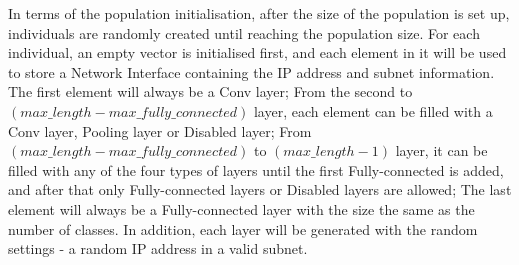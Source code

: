 \documentclass[conference]{IEEEtran}
\begin{document}

In terms of the population initialisation, after the size of the population is set up, individuals are randomly created until reaching the population size. 
For each individual, an empty vector is initialised first, and each element in it will be used to store a Network Interface containing the IP address and subnet information. The first element will always be a Conv layer; From the second to $(max\_length-max\_fully\_connected)$ layer, each element can be filled with a Conv layer, Pooling layer or Disabled layer; From $(max\_length-max\_fully\_connected)$ to $(max\_length-1)$ layer, it can be filled with any of the four types of layers until the first Fully-connected is added, and after that only Fully-connected layers or Disabled layers are allowed; The last element will always be a Fully-connected layer with the size the same as the number of classes. In addition, each layer will be generated with the random settings - a random IP address in a valid subnet.
\end{document}
